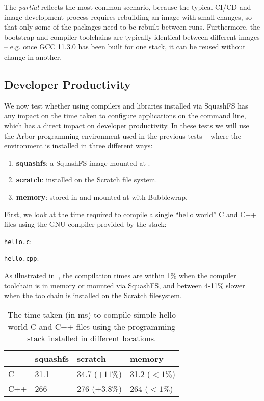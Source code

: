 The \emph{partial} reflects the most common scenario, because the typical CI/CD and image development process requires rebuilding an image with small changes, so that only some of the packages need to be rebuilt between runs.
Furthermore, the bootstrap and compiler toolchains are typically identical between different images -- e.g. once GCC 11.3.0 has been built for one stack, it can be reused without change in another.

\subsection{Developer Productivity}

We now test whether using compilers and libraries installed via SquashFS has any impact on the time taken to configure applications on the command line, which has a direct impact on developer productivity.
In these tests we will use the Arbor programming environment used in the previous tests -- where the environment is installed in three different ways:
\begin{enumerate}
    \item \textbf{squashfs}: a SquashFS image mounted at .
    \item \textbf{scratch}: installed on the Scratch file system.
    \item \textbf{memory}: stored in  and mounted at  with Bubblewrap.
\end{enumerate}

First, we look at the time required to compile a single ``hello world'' C and C++ files using the GNU compiler provided by the stack:

\noindent\texttt{hello.c}:

\noindent\texttt{hello.cpp}:


As illustrated in~, the compilation times are within 1\% when the compiler toolchain is in memory or mounted via SquashFS, and between 4-11\% slower when the toolchain is installed on the Scratch filesystem.
\begin{table}[hp!]
    \begin{center}
        \begin{tabular}{l | l l l}
                & squashfs & scratch & memory \\
                \hline
            C   &  31.1 &  34.7 ($+ 11\%$) &  31.2 ($ < 1 \%$) \\
            C++ & 266   & 276   ($+3.8\%$) & 264   ($ < 1 \%$) \\
        \end{tabular}
    \end{center}
    \caption{The time taken (in ms) to compile simple hello world C and C++ files using the programming stack installed in different locations.}
    \label{tbl:hello-world-compile}
\end{table}
    
